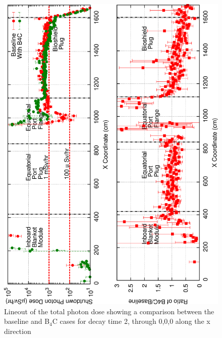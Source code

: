 \documentclass[12pt]{article}
\begin{document}
\begin{figure}[ht!]
\centering
\includegraphics[angle=-90,clip,scale=0.15]{../plots/photon_lineout/dc2_z0_lineout.png}
\caption{Lineout of the total photon dose showing a comparison between the baseline and B$_4$C cases for decay time 2,
         through 0,0,0 along the x direction}
\label{fig:photons_dc2_total_dose_lineout}
\end{figure}
\end{document}
